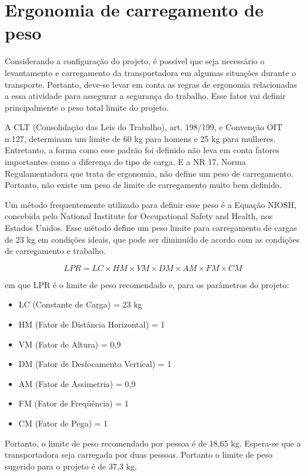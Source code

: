 \section{Ergonomia de carregamento de peso}

Considerando a configuração do projeto, é possível que seja necessário o levantamento e carregamento da transportadora em algumas situações durante o transporte. Portanto, deve-se levar em conta as regras de ergonomia relacionadas a essa atividade para assegurar a segurança do trabalho. Esse fator vai definir principalmente o peso total limite do projeto.

A CLT (Consolidação das Leis do Trabalho), art. 198/199, e Convenção OIT n.127, determinam um limite de 60 kg para homens e 25 kg para mulheres. Entretanto, a forma como esse padrão foi definido não leva em conta fatores importantes como a diferença do tipo de carga. E a NR 17, Norma Regulamentadora que trata de ergonomia, não define um peso de carregamento. Portanto, não existe um peso de limite de carregamento muito bem definido. \cite{ergotriade2016}

Um método frequentemente utilizado para definir esse peso é a Equação NIOSH, concebida pelo National Institute for Occupational Safety and Health, nos Estados Unidos. Esse método define um peso limite para carregamento de cargas de 23 kg em condições ideais, que pode ser diminuído de acordo com as condições de carregamento e trabalho.

\begin{equation}
LPR = LC \times HM \times VM \times DM \times AM \times FM \times CM
\end{equation}

em que LPR é o limite de peso recomendado e, para os parâmetros do projeto:

\begin{itemize}
\item LC (Constante de Carga) = 23 kg
\item HM (Fator de Distância Horizontal) = 1
\item VM (Fator de Altura) = 0,9
\item DM (Fator de Deslocamento Vertical) = 1
\item AM (Fator de Assimetria) = 0,9
\item FM (Fator de Freqüência) = 1
\item CM (Fator de Pega) = 1
\end{itemize}

Portanto, o limite de peso recomendado por pessoa é de 18,65 kg. Espera-se que a transportadora seja carregada por duas pessoas. Portanto o limite de peso sugerido para o projeto é de 37,3 kg.


